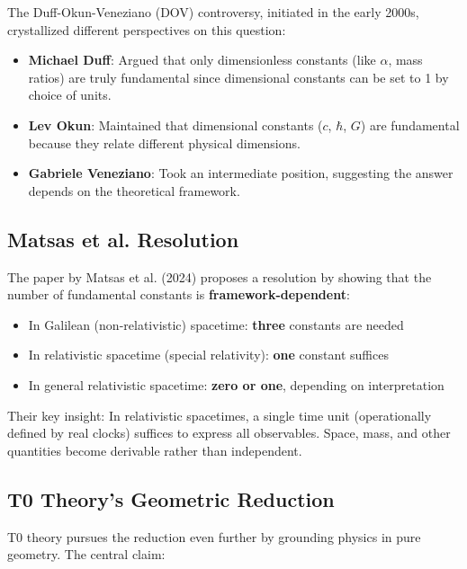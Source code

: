 	The Duff-Okun-Veneziano (DOV) controversy, initiated in the early 2000s, crystallized different perspectives on this question:
	
	\begin{itemize}
		\item \textbf{Michael Duff}: Argued that only dimensionless constants (like $\alpha$, mass ratios) are truly fundamental since dimensional constants can be set to 1 by choice of units.
		
		\item \textbf{Lev Okun}: Maintained that dimensional constants ($c$, $\hbar$, $G$) are fundamental because they relate different physical dimensions.
		
		\item \textbf{Gabriele Veneziano}: Took an intermediate position, suggesting the answer depends on the theoretical framework.
	\end{itemize}
	
	\subsection{Matsas et al. Resolution}
	
	The paper by Matsas et al. (2024) proposes a resolution by showing that the number of fundamental constants is \textbf{framework-dependent}:
	
	\begin{itemize}
		\item In Galilean (non-relativistic) spacetime: \textbf{three} constants are needed
		\item In relativistic spacetime (special relativity): \textbf{one} constant suffices
		\item In general relativistic spacetime: \textbf{zero or one}, depending on interpretation
	\end{itemize}
	
	Their key insight: In relativistic spacetimes, a single time unit (operationally defined by real clocks) suffices to express all observables. Space, mass, and other quantities become derivable rather than independent.
	
	\subsection{T0 Theory's Geometric Reduction}
	
	T0 theory pursues the reduction even further by grounding physics in pure geometry. The central claim:
	
